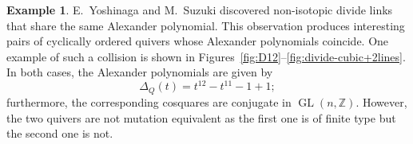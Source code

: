 \documentclass[11pt, letterpaper]{amsart}
\newcommand{\hide}[1]{}
\theoremstyle{definition}
\newtheorem{example}[theorem]{Example}
\numberwithin{equation}{section}
\def\ZZ{{\mathbb Z}}
\def\GL{{\operatorname{GL}}}
\begin{document}
\begin{example}
\label{eg:divides-collide}
E.~Yoshinaga and M.~Suzuki \cite{Yoshinaga} discovered non-isotopic divide links that share the same Alexander polynomial.
This observation produces interesting pairs of cyclically ordered quivers whose Alexander polynomials coincide.  
One example of such a collision is shown in Figures~\ref{fig:D12}--\ref{fig:divide-cubic+2lines}. 
In both cases, the Alexander polynomials are given by 
\begin{equation*}
\Delta_Q(t)=t^{12} - t^{11} -1 +1; 
\end{equation*}
furthermore, the corresponding cosquares are conjugate in $\GL(n,\ZZ)$. 
However, the two quivers are not mutation equivalent as the first one is of finite type but the second one is not.
\end{example}

\hide{
The corresponding exchange matrix appears below.
\begin{equation*}
B = 
\left[
\begin{array}{cccccccccccc}
0 & 0 & 0 & 1 & 1 & 1 & 0 & 0 & 0 & 0 & -1 & -1 \\
0 & 0 & 0 & 0 & 1 & 0 & 1 & 1 & 0 & 0 & -1 & -1 \\
0 & 0 & 0 & 0 & 0 & 0 & 0 & 1 & 1 & 1 & 0 & -1 \\
-1 & 0 & 0 & 0 & 0 & 0 & 0 & 0 & 0 & 0 & 1 & 0 \\
-1 & -1 & 0 & 0 & 0 & 0 & 0 & 0 & 0 & 0 & 1 & 1 \\
-1 & 0 & 0 & 0 & 0 & 0 & 0 & 0 & 0 & 0 & 0 & 1 \\
0 & -1 & 0 & 0 & 0 & 0 & 0 & 0 & 0 & 0 & 1 & 0 \\
0 & -1 & -1 & 0 & 0 & 0 & 0 & 0 & 0 & 0 & 0 & 1 \\
0 & 0 & -1 & 0 & 0 & 0 & 0 & 0 & 0 & 0 & 0 & 1 \\
0 & 0 & -1 & 0 & 0 & 0 & 0 & 0 & 0 & 0 & 0 & 0 \\
1 & 1 & 0 & -1 & -1 & 0 & -1 & 0 & 0 & 0 & 0 & 0 \\
1 & 1 & 1 & 0 & -1 & -1 & 0 & -1 & -1 & 0 & 0 & 0
\end{array}
\right]
.
\end{equation*}
} %
\end{document}
